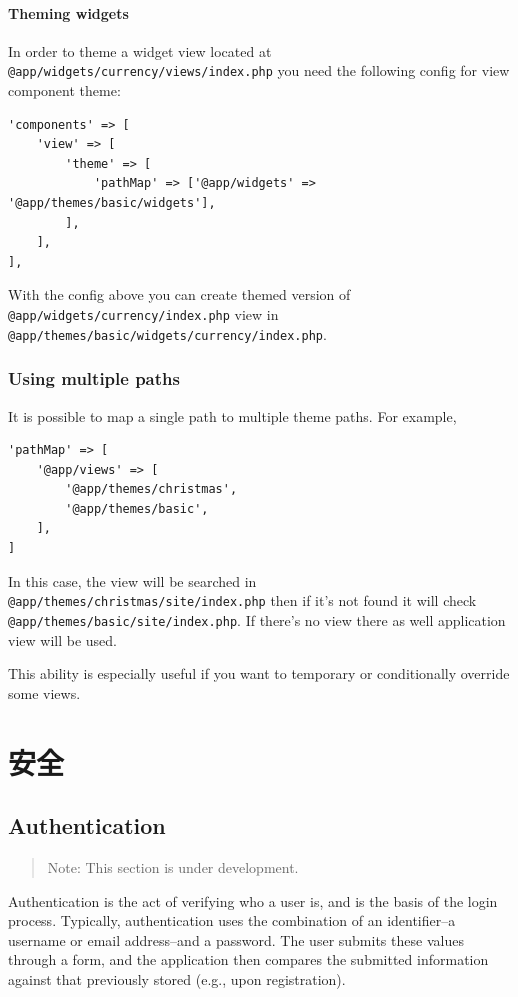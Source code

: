 \subsubsection{Theming widgets}
In order to theme a widget view located at \lstinline|@app/widgets/currency/views/index.php| you need the following config for
view component theme:

\lstset{language=php}\begin{lstlisting}
'components' => [
    'view' => [
        'theme' => [
            'pathMap' => ['@app/widgets' => '@app/themes/basic/widgets'],
        ],
    ],
],
\end{lstlisting}
With the config above you can create themed version of \lstinline|@app/widgets/currency/index.php| view in
\lstinline|@app/themes/basic/widgets/currency/index.php|.

\subsection{Using multiple paths}
It is possible to map a single path to multiple theme paths. For example,

\lstset{language=php}\begin{lstlisting}
'pathMap' => [
    '@app/views' => [
        '@app/themes/christmas',
        '@app/themes/basic',
    ],
]
\end{lstlisting}
In this case, the view will be searched in \lstinline|@app/themes/christmas/site/index.php| then if it's not found it will check
\lstinline|@app/themes/basic/site/index.php|. If there's no view there as well application view will be used.

This ability is especially useful if you want to temporary or conditionally override some views.



\chapter{安全}
\label{security-authentication.md}\section{Authentication}
\begin{quote}Note: This section is under development.

\end{quote}
Authentication is the act of verifying who a user is, and is the basis of the login process. Typically, authentication uses the combination of an identifier--a username or email address--and a password. The user submits these values  through a form, and the application then compares the submitted information against that previously stored (e.g., upon registration).

